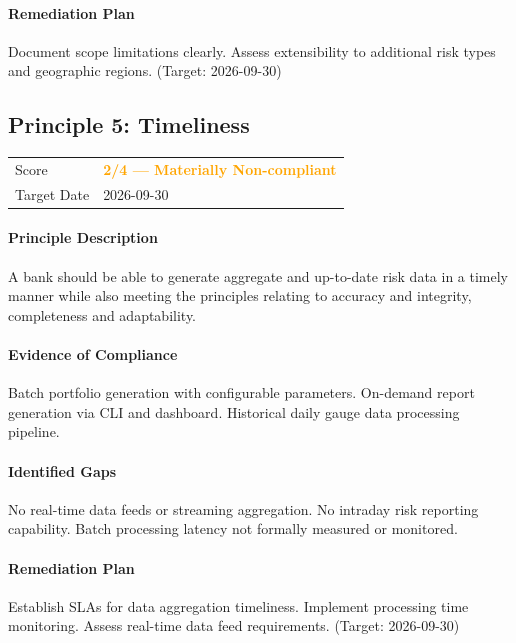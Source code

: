 \documentclass[11pt]{article}
\begin{document}
\paragraph{Remediation Plan}
Document scope limitations clearly. Assess extensibility to additional risk types and geographic regions. (Target: 2026-09-30)

\subsection{Principle 5: Timeliness}

\begin{table}[H]
    \centering
    \begin{tabular}{ll}
        \toprule
        Score & \textcolor{orange}{\textbf{2/4 --- Materially Non-compliant}} \\
        Target Date & 2026-09-30 \\
        \bottomrule
    \end{tabular}
\end{table}

\paragraph{Principle Description}
A bank should be able to generate aggregate and up-to-date risk data in a timely manner while also meeting the principles relating to accuracy and integrity, completeness and adaptability.

\paragraph{Evidence of Compliance}
Batch portfolio generation with configurable parameters. On-demand report generation via CLI and dashboard. Historical daily gauge data processing pipeline.

\paragraph{Identified Gaps}
No real-time data feeds or streaming aggregation. No intraday risk reporting capability. Batch processing latency not formally measured or monitored.

\paragraph{Remediation Plan}
Establish SLAs for data aggregation timeliness. Implement processing time monitoring. Assess real-time data feed requirements. (Target: 2026-09-30)
\end{document}
